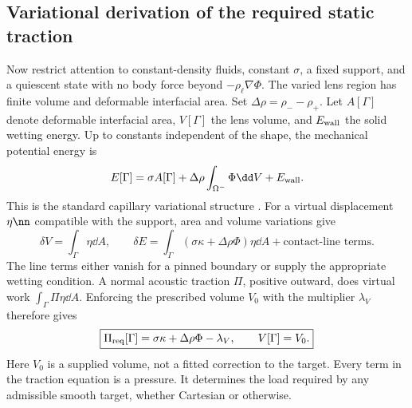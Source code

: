\subsection{Variational derivation of the required static traction}
Now restrict attention to constant-density fluids, constant $\sigma$, a fixed
support, and a quiescent state with no body force beyond $-\rho_\ell\nabla\Phi$.
The varied lens region has finite volume and deformable interfacial area. Set
$\Delta\rho=\rho_- -\rho_+$. Let $A[\Gamma]$ denote deformable interfacial area,
$V[\Gamma]$ the lens volume, and $E_{\rm wall}$ the solid wetting energy. Up to
constants independent of the shape, the mechanical potential energy is
\begin{equation}
 E[\Gamma]=\sigma A[\Gamma]
     +\Delta\rho\int_{\Omega^-}\Phi\dd V+E_{\rm wall}.
 \label{eq:capillary-energy}
\end{equation}
This is the standard capillary variational structure \cite{finn1986}. For a
virtual displacement $\eta\nn$ compatible with the support, area and volume
variations give
\begin{equation}
 \delta V=\int_\Gamma\eta\dd A,\qquad
 \delta E=\int_\Gamma(\sigma\kappa+\Delta\rho\Phi)\eta\dd A
                +\text{contact-line terms}.
 \label{eq:first-variation}
\end{equation}
The line terms either vanish for a pinned boundary or supply the appropriate
wetting condition. A normal acoustic traction $\Pi$, positive outward, does
virtual work $\int_\Gamma\Pi\eta\dd A$. Enforcing the prescribed volume
$V_0$ with the multiplier $\lambda_V$ therefore gives
\begin{equation}
 \boxed{\Pi_{\rm req}[\Gamma]
       =\sigma\kappa+\Delta\rho\Phi-\lambda_V,
       \qquad V[\Gamma]=V_0.}
 \label{eq:required-traction}
\end{equation}
Here $V_0$ is a supplied volume, not a fitted correction to the target. Every
term in the traction equation is a pressure. It determines the load required
by any admissible smooth target, whether Cartesian or otherwise.

